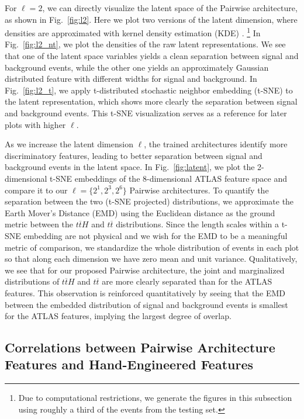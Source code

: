 \documentclass[aps,prd,twocolumn,superscriptaddress,floatfix,longbibliography,preprintnumbers,nofootinbib]{revtex4-1} %
\DeclareRobustCommand{\Fig}[1]{Fig.~\ref{fig:#1}}
\newcounter{para}
\begin{document}
For $\ell = 2$, we can directly visualize the latent space of the Pairwise architecture, as shown in \Fig{l2}.
%
Here we plot two versions of the latent dimension, where densities are approximated with kernel density estimation (KDE) \cite{Rosenblatt1956, Parzen1962}.%
%
\footnote{Due to computational restrictions, we generate the figures in this subsection using roughly a third of the events from the testing set.}
%
In \Fig{l2_nt}, we plot the densities of the raw latent representations.
%
We see that one of the latent space variables yields a clean separation between signal and background events, while the other one yields an approximately Gaussian distributed feature with different widths for signal and background.
%
In \Fig{l2_t}, we apply t-distributed stochastic neighbor embedding (t-SNE) \cite{VanDerMaaten2009,VanDerMaaten2012,Garcia-Alonso2014,VanDerMaaten2015} to the latent representation, which shows more clearly the separation between signal and background events.
%
This t-SNE visualization serves as a reference for later plots with higher $\ell$.


As we increase the latent dimension $\ell$, the trained architectures identify more discriminatory features, leading to better separation between signal and background events in the latent space.
%
In \Fig{latent}, we plot the 2-dimensional t-SNE embeddings of the 8-dimensional ATLAS feature space and compare it to our $\ell=\{2^1, 2^3,2^6\}$ Pairwise architectures.
%
To quantify the separation between the two (t-SNE projected) distributions, we approximate the Earth Mover's Distance (EMD) \cite{Peleg1989, Rubner, Rubner2000} using the Euclidean distance as the ground metric between the $t\overline{t}H$ and $t\overline{t}$ distributions.
%
Since the length scales within a t-SNE embedding are not physical and we wish for the EMD to be a meaningful metric of comparison, we standardize the whole distribution of events in each plot so that along each dimension we have zero mean and unit variance.
%
Qualitatively, we see that for our proposed Pairwise architecture, the joint and marginalized distributions of $t\overline{t}H$ and $t\overline{t}$ are more clearly separated than for the ATLAS features.
%
This observation is reinforced quantitatively by seeing that the EMD between the embedded distribution of signal and background events is smallest for the ATLAS features, implying the largest degree of overlap.

\subsection{Correlations between Pairwise Architecture Features and Hand-Engineered Features}
\end{document}
